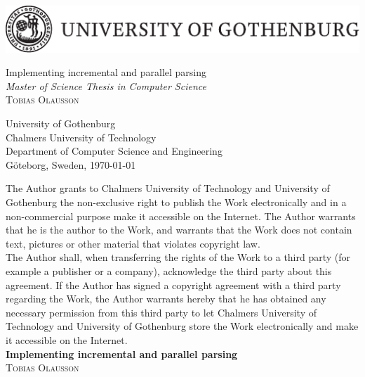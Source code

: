 \begin{titlepage}
\thispagestyle{empty}

\begin{center}
\includegraphics[width=\textwidth]{gulogo.pdf}
\end{center}

\vfill

\begin{flushleft}
{\LARGE Implementing incremental and parallel parsing} \\[0.2cm]
{\large \textit{Master of Science Thesis in Computer Science}}\\[3cm]

{\Huge \textsc{Tobias Olausson}}

\vfill

University of Gothenburg \\
Chalmers University of Technology \\
Department of Computer Science and Engineering \\
Göteborg, Sweden, \monthdate\today
\end{flushleft}

\newpage
\thispagestyle{plain}

\noindent The Author grants to Chalmers University of Technology and University
of Gothenburg  the non-exclusive right to publish the Work electronically and in
a non-commercial purpose make it accessible on the Internet.  The Author
warrants that he is the author to the Work, and warrants that the Work does
not contain text, pictures or other material that violates copyright law.\\

\noindent The Author shall, when transferring the rights of the Work to a third
party (for example a publisher or a company), acknowledge the third party about
this agreement. If the Author has signed a copyright agreement with a third
party regarding the Work, the Author warrants hereby that he has obtained
any necessary permission from this third party to let Chalmers University of
Technology and University of Gothenburg  store the Work electronically and make
it accessible on the Internet. \\[2cm]

\noindent \textbf{Implementing incremental and parallel parsing}\\
\noindent \textsc{Tobias Olausson} \\


\end{titlepage}
